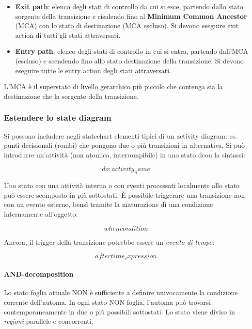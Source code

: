 \begin{itemize}
    \item \textbf{Exit path}: elenco degli stati di controllo da cui si esce, partendo dallo stato sorgente della transizione e risalendo fino al \textbf{Minimum Common Ancestor} (MCA) con lo stato di destinazione (MCA escluso). Si devono eseguire exit action di tutti gli stati attraversati.
    \item \textbf{Entry path}: elenco degli stati di controllo in cui si entra, partendo dall'MCA (escluso) e scendendo fino allo stato destinazione della transizione. Si devono eseguire tutte le entry action degli stati attraversati.
\end{itemize}

L'MCA è il superstato di livello gerarchico più piccolo che contenga sia la destinazione che la sorgente della transizione.\\

\subsubsection{Estendere lo state diagram}

Si possono includere negli statechart elementi tipici di un activity diagram: es. punti decisionali (rombi) che pongono due o più transizioni in alternativa. Si può introdurre un'attività (non atomica, interrompibile) in uno stato dcon la sintassi:

$$do:activity_name$$

Uno stato con una attività interna o con eventi processati localmente allo stato può essere scomposto in più sottostati. È possibile triggerare una transizione non con un evento esterno, bensì tramite la maturazione di una condizione internamente all'oggetto:

$$when condition$$

Ancora, il trigger della transizione potrebbe essere un \textit{evento di tempo}:

$$after time_expression$$


\paragraph{AND-decomposition} Lo stato foglia attuale NON è sufficiente a definire univocamente la condizione corrente dell'automa. In ogni stato NON foglia, l'automa può trovarsi contemporaneamente in due o più possibili sottostati. Lo stato viene diviso in \textit{regioni} parallele e concorrenti.

